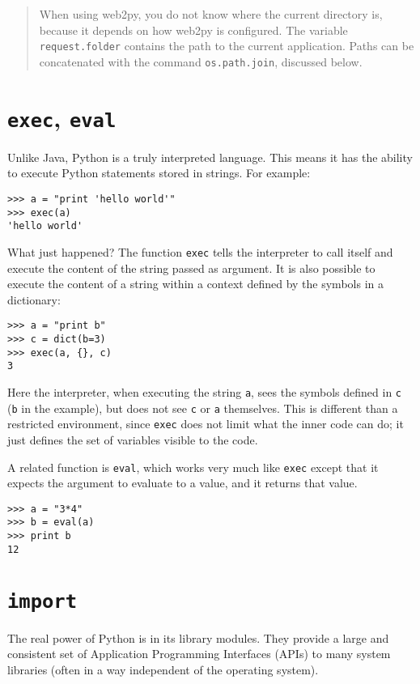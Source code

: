 \documentclass[justified,sixbynine,notoc]{tufte-book}
\def\ft{\small\tt}
\def\inxx#1{\index{#1}}
\begin{document}
\begin{fullwidth}
\begin{quote}When using web2py, you do not know where the current directory is, because it depends on how web2py is configured. The variable {\ft request.folder} contains the path to the current application. Paths can be concatenated with the command {\ft os.path.join}, discussed below.\end{quote}
\goodbreak\section{{\ft exec}, {\ft eval}}

\inxx{exec} \inxx{eval}

Unlike Java, Python is a truly interpreted language. This means it has the ability to execute Python statements stored in strings. For example:
\begin{lstlisting}
>>> a = "print 'hello world'"
>>> exec(a)
'hello world'
\end{lstlisting}

What just happened? The function {\ft exec} tells the interpreter to call itself and execute the content of the string passed as argument. It is also possible to execute the content of a string within a context defined by the symbols in a dictionary:
\begin{lstlisting}
>>> a = "print b"
>>> c = dict(b=3)
>>> exec(a, {}, c)
3
\end{lstlisting}

Here the interpreter, when executing the string {\ft a}, sees the symbols defined in {\ft c} ({\ft b} in the example), but does not see {\ft c} or {\ft a} themselves. This is different than a restricted environment, since {\ft exec} does not limit what the inner code can do; it just defines the set of variables visible to the code.

A related function is {\ft eval}, which works very much like {\ft exec} except that it expects the argument to evaluate to a value, and it returns that value.
\begin{lstlisting}
>>> a = "3*4"
>>> b = eval(a)
>>> print b
12
\end{lstlisting}

\goodbreak\section{{\ft import}}

\inxx{import} \inxx{random}
The real power of Python is in its library modules. They provide a large and consistent set of Application Programming Interfaces (APIs) to many system libraries (often in a way independent of the operating system).


\end{fullwidth}
\end{document}

